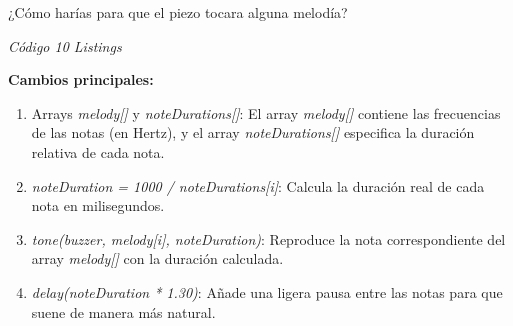 ¿Cómo harías para que el piezo tocara alguna melodía?

\emph{Código 10 Listings}

\textbf{Cambios principales:}
\begin{enumerate}
  \item Arrays \emph{melody[]} y \emph{noteDurations[]}: El array \emph{melody[]} contiene las frecuencias de las notas (en Hertz), y el array \emph{noteDurations[]} especifica la duración relativa de cada nota.
  \item \emph{noteDuration = 1000 / noteDurations[i]}: Calcula la duración real de cada nota en milisegundos.
  \item \emph{tone(buzzer, melody[i], noteDuration)}: Reproduce la nota correspondiente del array \emph{melody[]} con la duración calculada.
  \item \emph{delay(noteDuration * 1.30)}: Añade una ligera pausa entre las notas para que suene de manera más natural.
\end{enumerate}
